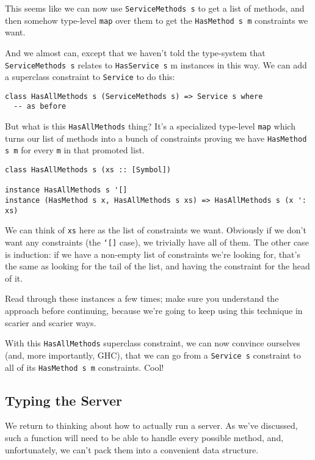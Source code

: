This seems like we can now use \texttt{ServiceMethods s} to get a list of methods, and then somehow type-level \texttt{map} over them to get the \texttt{HasMethod s m} constraints we want.

And we almost can, except that we haven't told the type-system that \texttt{ServiceMethods s} relates to \texttt{HasService s} m instances in this way. We can add a superclass constraint to \texttt{Service} to do this:

\begin{verbatim}
class HasAllMethods s (ServiceMethods s) => Service s where
  -- as before
\end{verbatim}
But what is this \texttt{HasAllMethods} thing? It's a specialized type-level \texttt{map} which turns our list of methods into a bunch of constraints proving we have \texttt{HasMethod s m} for every \texttt{m} in that promoted list.

\begin{verbatim}
class HasAllMethods s (xs :: [Symbol])

instance HasAllMethods s '[]
instance (HasMethod s x, HasAllMethods s xs) => HasAllMethods s (x ': xs)
\end{verbatim}
We can think of \texttt{xs} here as the list of constraints we want. Obviously if we don't want any constraints (the \texttt{`[]} case), we trivially have all of them. The other case is induction: if we have a non-empty list of constraints we're looking for, that's the same as looking for the tail of the list, and having the constraint for the head of it.

Read through these instances a few times; make sure you understand the approach before continuing, because we're going to keep using this technique in scarier and scarier ways.

With this \texttt{HasAllMethods} superclass constraint, we can now convince ourselves (and, more importantly, GHC), that we can go from a \texttt{Service s} constraint to all of its \texttt{HasMethod s m} constraints. Cool!

\subsection{Typing the Server}


We return to thinking about how to actually run a server. As we've discussed, such a function will need to be able to handle every possible method, and, unfortunately, we can't pack them into a convenient data structure.

